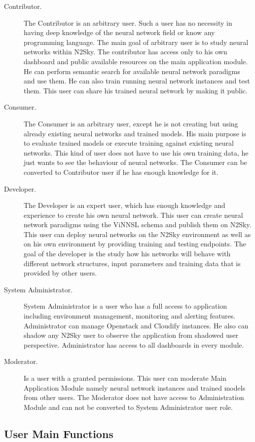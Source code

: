 \begin{description}
\item[Contributor.]   The Contributor is an arbitrary user. Such a user has no necessity in having deep knowledge of the neural network field or know any programming language. The main goal of arbitrary user is to study neural networks within N2Sky. The contributor has access only to his own dashboard and public available resources on the main application module. He can perform semantic search for available neural network paradigms and use them. He can also train running neural network instances and test them. This user can share his trained neural network by making it public. 
\item[Consumer.] The Consumer is an arbitrary user, except he is not creating but using already existing neural networks and trained models. His main purpose is to evaluate trained models or execute training against existing neural networks. This kind of user does not have to use his own training data, he just wants to see the behaviour of neural networks. The Consumer can be converted to Contributor user if he has enough knowledge for it. 
\item[Developer.] The Developer is an expert user, which has enough knowledge and experience to create his own neural network. This user can create neural network paradigms using the ViNNSL schema and publish them on N2Sky. This user can deploy neural networks on the N2Sky environment as well as on his own environment by providing training and testing endpoints. The goal of the developer is the study how his networks will behave with different network structures, input parameters and training data that is provided by other users.
\item[System Administrator.] System Administrator is a user who has a full access to application including environment management, monitoring and alerting features. Administrator can manage Openstack and Cloudify instances. He also can shadow any N2Sky user to observe the application from shadowed user perspective. Administrator has access to all dashboards in every module.
\item[Moderator.] Is a user with a granted permissions. This user can moderate Main Application Module namely neural network instances and  trained models from other users. The Moderator does not have access to Administration Module and can not be converted to System Administrator user role.
\end{description}

\subsection{User Main Functions}\label{User Permissions}

